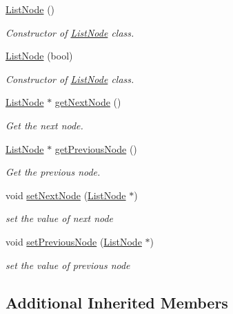 \begin{DoxyCompactItemize}
\item 
\hyperlink{class_list_node_ac8e8674ba4da13a5074bfdf49471c585}{List\+Node} ()
\begin{DoxyCompactList}\small\item\em Constructor of \hyperlink{class_list_node}{List\+Node} class. \end{DoxyCompactList}\item 
\hyperlink{class_list_node_a40fa34640e78f3d0bcb576feb52edcaf}{List\+Node} (bool)
\begin{DoxyCompactList}\small\item\em Constructor of \hyperlink{class_list_node}{List\+Node} class. \end{DoxyCompactList}\item 
\hyperlink{class_list_node}{List\+Node} $\ast$ \hyperlink{class_list_node_a67d0812638ee0cf0504c4e26300140f4}{get\+Next\+Node} ()
\begin{DoxyCompactList}\small\item\em Get the next node. \end{DoxyCompactList}\item 
\hyperlink{class_list_node}{List\+Node} $\ast$ \hyperlink{class_list_node_ac9da9956959adb42c1208090358b27a9}{get\+Previous\+Node} ()
\begin{DoxyCompactList}\small\item\em Get the previous node. \end{DoxyCompactList}\item 
void \hyperlink{class_list_node_aea1731114341126c371cd2fa5f674a11}{set\+Next\+Node} (\hyperlink{class_list_node}{List\+Node} $\ast$)
\begin{DoxyCompactList}\small\item\em set the value of next node \end{DoxyCompactList}\item 
void \hyperlink{class_list_node_aa45816b74681f1b3765003477b5f2771}{set\+Previous\+Node} (\hyperlink{class_list_node}{List\+Node} $\ast$)
\begin{DoxyCompactList}\small\item\em set the value of previous node \end{DoxyCompactList}\end{DoxyCompactItemize}
\subsection*{Additional Inherited Members}


